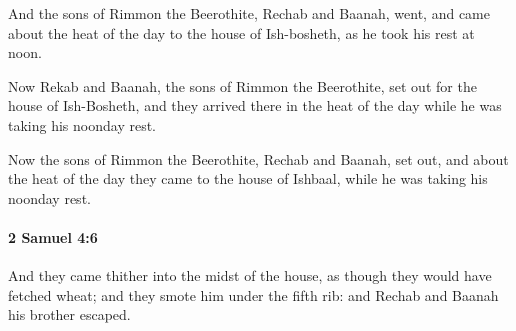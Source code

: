 			\begin{versebox}
					\item[BHS] 
					\item[ASV] And the sons of Rimmon the Beerothite, Rechab and Baanah, went, and came about the heat of the day to the house of Ish-bosheth, as he took his rest at noon.
					\item[NIV] Now Rekab and Baanah, the sons of Rimmon the Beerothite, set out for the house of Ish-Bosheth, and they arrived there in the heat of the day while he was taking his noonday rest.
					\item[NRSV] Now the sons of Rimmon the Beerothite, Rechab and Baanah, set out, and about the heat of the day they came to the house of Ishbaal, while he was taking his noonday rest.
			\end{versebox}

		\paragraph{2 Samuel 4:6} %
			\label{2SAMUEL-4-6}

			And they came thither into the midst of the house, as though they would have fetched wheat; and they smote him under the fifth rib: and Rechab and Baanah his brother escaped.

